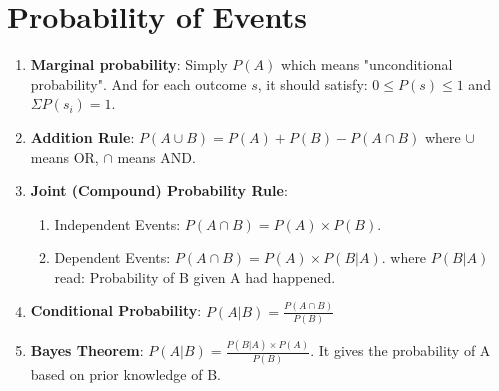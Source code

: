 \documentclass[11pt, twocolumn]{article}
\begin{document}
\section{Probability of Events}
\begin{enumerate}
\item \textbf{Marginal probability}: Simply $P(A)$ which means "unconditional probability". And for each outcome $s$, it should satisfy: $ 0 \leq P(s) \leq 1$ and $\Sigma P(s_i) = 1$.
\item \textbf{Addition Rule}: $P(A \cup B) = P(A) + P(B) - P(A \cap B)$ where $\cup$ means OR, $\cap$ means AND.
\item \textbf{Joint (Compound) Probability Rule}:
	\begin{enumerate}
	\item Independent Events: $P(A \cap B) = P(A) \times P(B)$.
	\item Dependent Events: $P(A \cap B) = P(A) \times P(B | A)$. where $P(B | A)$ read: Probability of B given A had happened.
	\end{enumerate}
\item \textbf{Conditional Probability}: $P(A | B) = \frac{P(A \cap B)}{P(B)}$
\item \textbf{Bayes Theorem}: $P(A | B) = \frac{P(B | A) \times P(A)}{P(B)}$. It gives the probability of A based on prior knowledge of B.
\end{enumerate}
\end{document}
